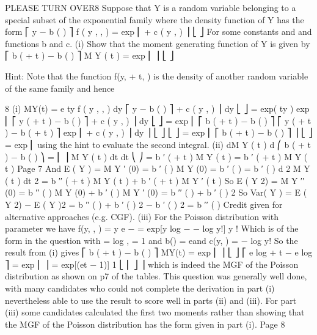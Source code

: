 PLEASE TURN OVER8
Suppose that Y is a random variable belonging to a special subset of the exponential
family where the density function of Y has the form
⎡ y \theta  − b ( \theta  )
⎤
f ( y , \theta  , \phi  ) = exp ⎢
+ c ( y , \phi  ) ⎥
\phi 
⎣
⎦
For some constants \theta  and \phi  and functions b and c.
(i)
Show that the moment generating function of Y is given by
⎡ b ( \theta  + t \phi  ) − b ( \theta  ) ⎤
M Y ( t ) = exp ⎢
⎥
\phi 
⎣
⎦

Hint: Note that the function f(y, \theta  + \phi t, \phi ) is the density of another random variable of
the same family and hence


8
(i)
MY(t) = \int  e ty f ( y , \theta  , \phi  ) dy
⎡ y \theta  − b ( \theta  )
⎤
+ c ( y , \phi  ) ⎥ dy
\phi 
⎣
⎦
= \int  exp( ty ) exp ⎢
⎡ y ( \theta  + t \phi  ) − b ( \theta  )
⎤
+ c ( y , \phi  ) ⎥ dy
\phi 
⎣
⎦
= \int  exp ⎢
⎡ b ( \theta  + t \phi  ) − b ( \theta  ) ⎤
⎡ y ( \theta  + \phi  t ) − b ( \theta  + \phi  t )
⎤
exp ⎢
+ c ( y , \phi  ) ⎥ dy
⎥
\int 
\phi 
\phi 
⎣
⎦
⎣
⎦
= exp ⎢
⎡ b ( \theta  + t \phi  ) − b ( \theta  ) ⎤
⎥ 
\phi 
⎣
⎦
= exp ⎢
using the hint to evaluate the second integral.
(ii)
dM Y ( t )
d ⎛ b ( \theta  + t \phi  ) − b ( \theta  ) ⎞
=
⎜
⎟ M Y ( t )
dt
\phi 
dt ⎝
⎠
=
\phi  b ′ ( \theta  + t \phi  )
M Y ( t )
\phi 
= b ′ ( \theta  + t \phi  ) M Y ( t )
Page 7%
And E ( Y ) = M Y ′ (0) = b ′ ( \theta  ) M Y (0) = b ′ ( \theta  )  = b ′ ( \theta  )
d 2 M Y ( t )
dt 2
= \phi  b ′′ ( \theta  + t \phi  ) M Y ( t ) + b ′ ( \theta  + t \phi  ) M Y ′ ( t )
So E ( Y 2) = M Y ′′ (0) = \phi  b ′′ ( \theta  ) M Y (0) + b ′ ( \theta  ) M Y ′ (0)
= \phi  b ′′ ( \theta  ) + b ′ ( \theta  ) 2
So Var( Y ) = E ( Y 2) − E ( Y )2 = \phi  b ′′ ( \theta  ) + b ′ ( \theta  ) 2 − b ′ ( \theta  ) 2 = \phi  b ′′ ( \theta  )
Credit given for alternative approaches (e.g. CGF).
(iii)
For the Poisson distribution with parameter \mu  we have
f(y, \theta , \phi ) =
\mu  y e −\mu 
= exp[y log \mu  − \mu  − log y!]
y !
Which is of the form in the question with \theta  = log \mu , \phi  = 1 and b(\theta ) = e\theta  and
c(y, \phi ) = − log y!
So the result from (i) gives
⎡ b ( \theta  + t \phi  ) − b ( \theta  ) ⎤
MY(t) = exp ⎢
⎥
\phi 
⎣
⎦
⎡ e log \mu + t − e log \mu  ⎤
= exp ⎢
⎥ = exp[\mu (et − 1)]
1
⎣ ⎢
⎦ ⎥
which is indeed the MGF of the Poisson distribution as shown on p7 of the
tables.
This question was generally well done, with many candidates who could not complete
the derivation in part (i) nevertheless able to use the result to score well in parts (ii)
and (iii). For part (iii) some candidates calculated the first two moments rather than
showing that the MGF of the Poisson distribution has the form given in part (i).
Page 8%
